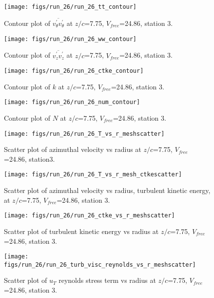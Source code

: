 \begin{figure}[H]
\centering
\texttt{[image: figs/run\_26/run\_26\_tt\_contour]}
\caption{Contour plot of $\overline{v_{\theta}^{\prime} v_{\theta}^{\prime}}$ at $z/c$=7.75, $V_{free}$=24.86, station 3.}
\end{figure}


\begin{figure}[H]
\centering
\texttt{[image: figs/run\_26/run\_26\_ww\_contour]}
\caption{Contour plot of $\overline{v_{z}^{\prime} v_{z}^{\prime}}$ at $z/c$=7.75, $V_{free}$=24.86, station 3.}
\end{figure}


\begin{figure}[H]
\centering
\texttt{[image: figs/run\_26/run\_26\_ctke\_contour]}
\caption{Contour plot of $k$ at $z/c$=7.75, $V_{free}$=24.86, station 3.}
\end{figure}


\begin{figure}[H]
\centering
\texttt{[image: figs/run\_26/run\_26\_num\_contour]}
\caption{Contour plot of $N$ at $z/c$=7.75, $V_{free}$=24.86, station 3.}
\end{figure}


\begin{figure}[H]
\centering
\texttt{[image: figs/run\_26/run\_26\_T\_vs\_r\_meshscatter]}
\caption{Scatter plot of azimuthal velocity vs radius at $z/c$=7.75, $V_{free}$=24.86, station3.}
\end{figure}


\begin{figure}[H]
\centering
\texttt{[image: figs/run\_26/run\_26\_T\_vs\_r\_mesh\_ctkescatter]}
\caption{Scatter plot of azimuthal velocity vs radius, turbulent kinetic energy, at $z/c$=7.75, $V_{free}$=24.86, station 3.}
\end{figure}


\begin{figure}[H]
\centering
\texttt{[image: figs/run\_26/run\_26\_ctke\_vs\_r\_meshscatter]}
\caption{Scatter plot of turbulent kinetic energy vs radius at $z/c$=7.75, $V_{free}$=24.86, station 3.}
\end{figure}


\begin{figure}[H]
\centering
\texttt{[image: figs/run\_26/run\_26\_turb\_visc\_reynolds\_vs\_r\_meshscatter]}
\caption{Scatter plot of $
u_T$ reynolds stress term vs radius at $z/c$=7.75, $V_{free}$=24.86, station 3.}
\end{figure}


